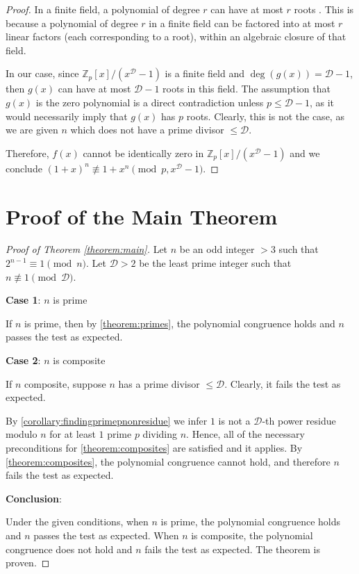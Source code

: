 \documentclass{article}
\theoremstyle{plain}
\theoremstyle{definition}
\newcommand{\D}{\mathcal{D}}
\begin{document}
\begin{proof}
In a finite field, a polynomial of degree $r$ can have at most $r$ roots \cite{dummit2004abstractalgebra}. This is because a polynomial of degree $r$ in a finite field can be factored into at most $r$ linear factors (each corresponding to a root), within an algebraic closure of that field.

In our case, since $\mathbb{Z}_p[x]/(x^{\D} - 1)$ is a finite field and $\deg(g(x)) = \D-1$, then $g(x)$ can have at most $\D-1$ roots in this field. The assumption that $g(x)$ is the zero polynomial is a direct contradiction unless $p \leq \D-1$, as it would necessarily imply that $g(x)$ has $p$ roots. Clearly, this is not the case, as we are given $n$ which does not have a prime divisor $\leq \D$.

Therefore, $f(x)$ cannot be identically zero in $\mathbb{Z}_p[x]/(x^\D - 1)$ and we conclude $(1 + x)^n \not\equiv 1 + x^n \pmod{p, x^\D - 1}$.
\end{proof}

\section{Proof of the Main Theorem}
\begin{proof}[Proof of Theorem \ref{theorem:main}]
Let $n$ be an odd integer $>3$ such that $2^{n-1} \equiv 1 \pmod{n}$. Let $\D > 2$ be the least prime integer such that $n \not\equiv 1 \pmod{\D}$.

\textbf{Case 1}: $n$ is prime

If $n$ is prime, then by \cref{theorem:primes}, the polynomial congruence holds and $n$ passes the test as expected.

\textbf{Case 2}: $n$ is composite

If $n$ composite, suppose $n$ has a prime divisor $\leq \D$. Clearly, it fails the test as expected.

By \cref{corollary:findingprimepnonresidue} we infer $1$ is not a $\D$-th power residue modulo $n$ for at least $1$ prime $p$ dividing $n$. Hence, all of the necessary preconditions for \cref{theorem:composites} are satisfied and it applies. By \cref{theorem:composites}, the polynomial congruence cannot hold, and therefore $n$ fails the test as expected.

\textbf{Conclusion}:

Under the given conditions, when $n$ is prime, the polynomial congruence holds and $n$ passes the test as expected. When $n$ is composite, the polynomial congruence does not hold and $n$ fails the test as expected. The theorem is proven.
\end{proof}
\end{document}
